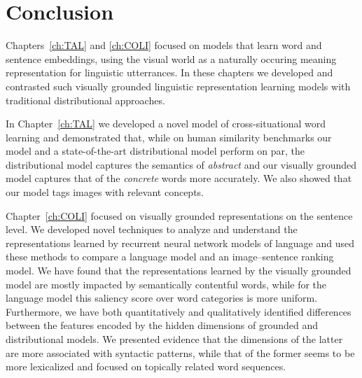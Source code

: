 \section{Conclusion}

Chapters~\ref{ch:TAL} and \ref{ch:COLI} focused on models that learn word and sentence embeddings, 
using the visual world as a naturally occuring meaning representation for linguistic utterrances. 
In these chapters we developed and contrasted such visually grounded linguistic representation learning
models with traditional distributional approaches. 

In Chapter~\ref{ch:TAL} we developed a novel model of cross-situational word learning and
demonstrated that, while on human similarity benchmarks our model and a state-of-the-art distributional model 
perform on par, the distributional model captures the semantics of \emph{abstract} and our visually grounded model 
captures that of the \emph{concrete} words more accurately. We also showed that our model tags images with relevant
concepts.

  
Chapter~\ref{ch:COLI} focused on visually grounded representations on the sentence level. 
We developed novel techniques to analyze and understand the representations learned by recurrent
neural network models of language and used these methods to compare a language model and an image--sentence ranking
model.
We have found that the representations learned by the visually grounded model are 
mostly impacted by semantically contentful words, while
for the language model this saliency score over word categories is more uniform. Furthermore, we have 
both quantitatively and qualitatively identified differences between the features encoded by the hidden dimensions
of grounded and distributional models. We presented evidence that
the dimensions of the latter are more associated with syntactic patterns, while  that of the former seems 
to be more lexicalized and focused on topically related word sequences.

